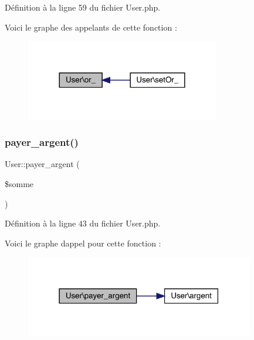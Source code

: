 Définition à la ligne 59 du fichier User.\+php.

Voici le graphe des appelants de cette fonction \+:\nopagebreak
\begin{figure}[H]
\begin{center}
\leavevmode
\includegraphics[width=240pt]{class_user_a1323f270a1285588987ef21bf704975c_icgraph}
\end{center}
\end{figure}
\mbox{\label{class_user_ad1c97f448cd6d5258f4b1ab9f36172ed}} 
\subsubsection{\texorpdfstring{payer\+\_\+argent()}{payer\_argent()}}
{\footnotesize\ttfamily User\+::payer\+\_\+argent (\begin{DoxyParamCaption}\item[{}]{\$somme }\end{DoxyParamCaption})}



Définition à la ligne 43 du fichier User.\+php.

Voici le graphe d\textquotesingle{}appel pour cette fonction \+:\nopagebreak
\begin{figure}[H]
\begin{center}
\leavevmode
\includegraphics[width=283pt]{class_user_ad1c97f448cd6d5258f4b1ab9f36172ed_cgraph}
\end{center}
\end{figure}
\mbox{\label{class_user_a5589abfe412eaa4755f3c984729802b7}} 
